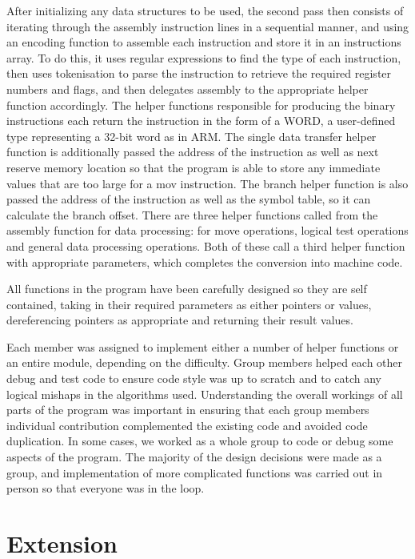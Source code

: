 \documentclass[11pt]{article}
\begin{document}
After initializing any data structures to be used, the second pass then consists of iterating through the assembly instruction lines in a sequential manner, and using an encoding function to assemble each instruction and store it in an instructions array. To do this, it uses regular expressions to find the type of each instruction, then uses tokenisation to parse the instruction to retrieve the required register numbers and flags, and then delegates assembly to the appropriate helper function accordingly. 
The helper functions responsible for producing the binary instructions each return the instruction in the form of a WORD, a user-defined type representing a 32-bit word as in ARM. The single data transfer helper function is additionally passed the address of the instruction as well as next reserve memory location so that the program is able to store any immediate values that are too large for a mov instruction.
The branch helper function is also passed the address of the instruction as well as the symbol table, so it can calculate the branch offset.
There are three helper functions called from the assembly function for data processing: for move operations, logical test operations and general data processing operations. Both of these call a third helper function with appropriate parameters, which completes the conversion into machine code.

All functions in the program have been carefully designed so they are self contained, taking in their required parameters as either pointers or values, dereferencing pointers as appropriate and returning their result values.

Each member was assigned to implement either a number of helper functions or an entire module, depending on the difficulty. Group members helped each other debug and test code to ensure code style was up to scratch and to catch any logical mishaps in the algorithms used. Understanding the overall workings of all parts of the program was important in ensuring that each group members individual contribution complemented the existing code and avoided code duplication. In some cases, we worked as a whole group to code or debug some aspects of the program. The majority of the design decisions were made as a group, and implementation of more complicated functions was carried out in person so that everyone was in the loop. 

\section{Extension}
\end{document}
